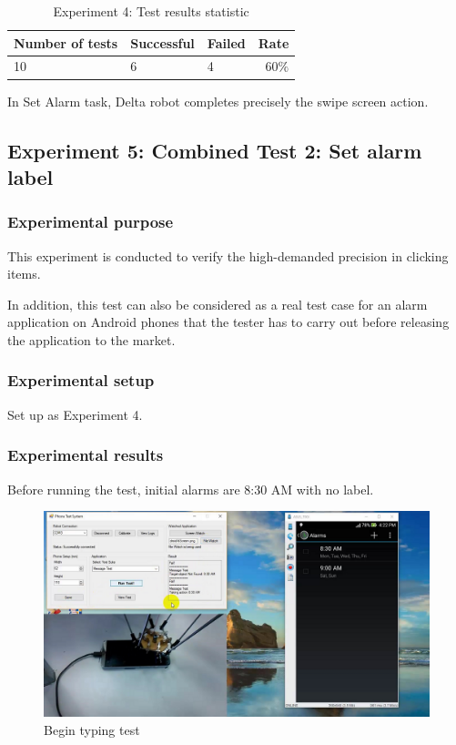 \begin{table}[H]
	\centering
	\caption{Experiment 4: Test results statistic}	
	\label{tab:exp4_result_stat}
	\begin{tabular}{|lll|r|}
		\hline
		\textbf{Number of tests} & \textbf{Successful} & \textbf{Failed} & \textbf{Rate} \\
		\hline
		10 & 6 & 4 & 60$\%$\\
		\hline
	\end{tabular}
\end{table}

In Set Alarm task, Delta robot completes precisely the swipe screen action.

\subsection{Experiment 5: Combined Test 2: Set alarm label}
\subsubsection{Experimental purpose}
This experiment is conducted to verify the high-demanded precision in clicking items.

In addition, this test can also be considered as a real test case for an alarm application on Android phones that the tester has to carry out before releasing the application to the market.

\subsubsection{Experimental setup}
Set up as Experiment 4.

\subsubsection{Experimental results}
Before running the test, initial alarms are 8:30 AM with no label.

	\begin{figure}[H]
		\centering
		\includegraphics[scale=0.5]{Chapters/Fig/label_first.png}
		\caption{Begin typing test}
		\label{fig:label_first}
	\end{figure}

